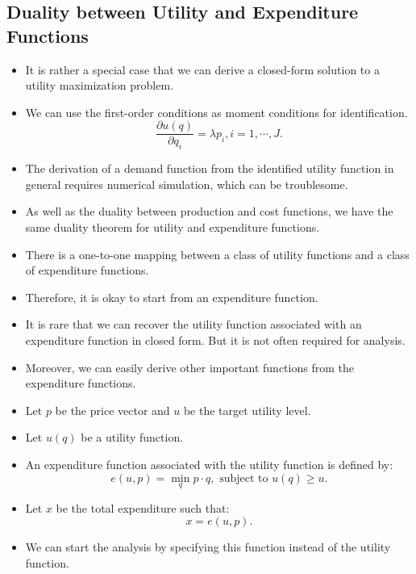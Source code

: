\documentclass[
]{book}
\providecommand{\tightlist}{%
  \setlength{\itemsep}{0pt}\setlength{\parskip}{0pt}}
\begin{document}
\hypertarget{duality-between-utility-and-expenditure-functions}{%
\subsection{Duality between Utility and Expenditure Functions}\label{duality-between-utility-and-expenditure-functions}}

\begin{itemize}
\tightlist
\item
  It is rather a special case that we can derive a closed-form solution to a utility maximization problem.
\item
  We can use the first-order conditions as moment conditions for identification.
  \begin{equation}
  \frac{\partial u(q)}{\partial q_i} = \lambda p_i, i = 1, \cdots, J.
  \end{equation}
\item
  The derivation of a demand function from the identified utility function in general requires numerical simulation, which can be troublesome.
\item
  As well as the duality between production and cost functions, we have the same duality theorem for utility and expenditure functions.
\item
  There is a one-to-one mapping between a class of utility functions and a class of expenditure functions.
\item
  Therefore, it is okay to start from an expenditure function.
\item
  It is rare that we can recover the utility function associated with an expenditure function in closed form. But it is not often required for analysis.
\item
  Moreover, we can easily derive other important functions from the expenditure functions.
\item
  Let \(p\) be the price vector and \(u\) be the target utility level.
\item
  Let \(u(q)\) be a utility function.
\item
  An expenditure function associated with the utility function is defined by:
  \begin{equation}
  e(u, p) = \min_{q} p \cdot q, \text{ subject to } u(q) \ge u.
  \end{equation}
\item
  Let \(x\) be the total expenditure such that:
  \begin{equation}
  x = e(u, p).
  \end{equation}
\item
  We can start the analysis by specifying this function instead of the utility function.
\end{itemize}
\end{document}
